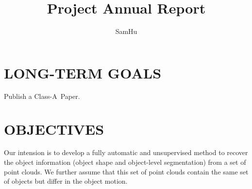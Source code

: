 \documentclass{onrannual}
\author{SamHu}
\affil{%
phone: +8615656928957  email: \href{sy891228@mail.ustc.edu.cn}{sy891228@mail.ustc.edu.cn} \\}
\title{Project Annual Report}
\begin{document}
    


\maketitle

\section{LONG-TERM GOALS}
Publish a Class-A~Paper.
\section{OBJECTIVES}
Our intension is to develop a fully automatic and unsupervised method to recover the object information (object shape and object-level segmentation) from a set of point clouds. We further assume that this set of point clouds contain the same set of objects but differ in the object motion.
\end{document}
